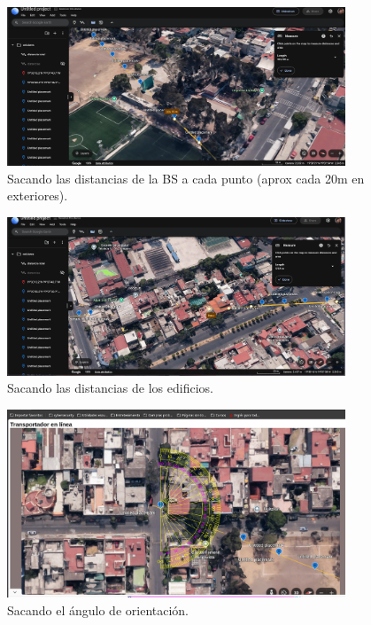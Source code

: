 \begin{enumerate}
          \begin{figure}[H]
              \centering
              \includegraphics[width=0.9\textwidth]{./img/distancias-puntos.png}
              \caption{Sacando las distancias de la BS a cada punto (aprox cada 20m en exteriores).}
              \label{fig:distancias-puntos}
          \end{figure}
          \begin{figure}[H]
              \centering
              \includegraphics[width=0.9\textwidth]{./img/distancias-edificios.png}
              \caption{Sacando las distancias de los edificios.}
              \label{fig:distancias-edificios}
          \end{figure}
          \begin{figure}[H]
              \centering
              \includegraphics[width=0.9\textwidth]{./img/angulo.png} 
              \caption{Sacando el ángulo de orientación.}
              \label{fig:angulo-orientacion}
          \end{figure}



\end{enumerate}
